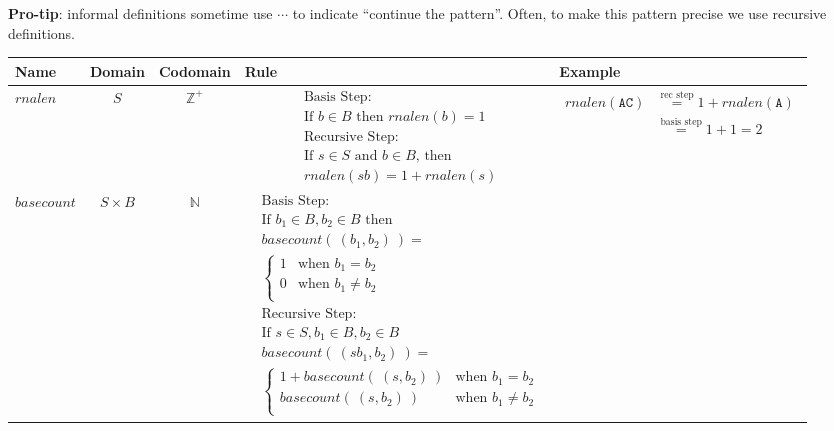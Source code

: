 \documentclass[12pt, oneside]{article}
\newcommand{\A}[0]{\texttt{A}}
\newcommand{\C}[0]{\texttt{C}}
\begin{document}
\vfill

{\bf Pro-tip}: informal definitions sometime use $\cdots$ to indicate ``continue the pattern''. Often, 
to make this pattern precise we use recursive definitions.
\newpage
\begin{center}
\begin{tabular}{p{0.65in}ccp{2.4in}p{2.4in}}
{\scriptsize {\bf Name}} & {\scriptsize {\bf  Domain}} & {\scriptsize {\bf Codomain}} & {\scriptsize {\bf Rule}} &{\scriptsize {\bf Example}}\\
\hline 
$rnalen$ & $S$ & $\mathbb{Z}^+$ & 
    {\begin{align*}    
    &\textrm{Basis Step:} \\
    &\textrm{If } b \in B\textrm{ then } \textit{rnalen}(b) = 1 \\
    &\textrm{Recursive Step:}\\
    &\textrm{If } s \in S\textrm{ and } b \in B\textrm{, then  }\\
    &\textit{rnalen}(sb) = 1 + \textit{rnalen}(s)
    \end{align*}} & 
    {\begin{align*}
        rnalen(\A\C) &\overset{\text{rec step}}{=} 1 +rnalen(\A) \\ 
        &\overset{\text{basis step}}{=} 1 + 1 = 2
    \end{align*}}\\
\hline
$basecount$ & $S \times B$ & $\mathbb{N}$ & 
{\begin{align*}    
    &\textrm{Basis Step:} \\
    &\textrm{If } b_1 \in B, b_2 \in B \textrm{ then} \\
    &basecount(~(b_1, b_2)~) = \\
    &\begin{cases}
        1 & \textrm{when } b_1 = b_2 \\
        0 & \textrm{when } b_1 \neq b_2 \\
    \end{cases}\\
    &\textrm{Recursive Step:}\\
    &\textrm{If } s \in S, b_1 \in B, b_2 \in B\\
    &basecount(~(sb_1, b_2)~) = \\
    &\begin{cases}
        1 + \textit{basecount}(~(s, b_2)~) & \textrm{when } b_1 = b_2 \\
        \textit{basecount}(~(s, b_2)~) & \textrm{when } b_1 \neq b_2 \\

\end{cases}
\end{align*}}
\end{tabular}
\end{center}
\end{document}
